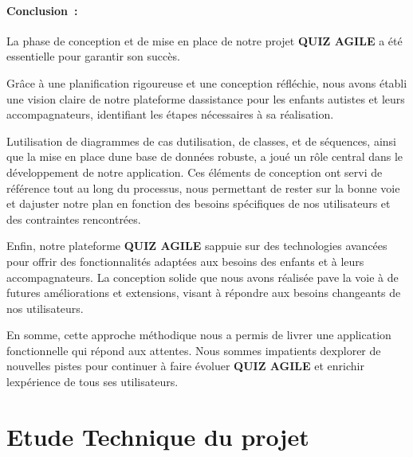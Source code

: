 \documentclass[12pt,a4paper,twoside,openright]{report}
\let\origchapter\chapter
\renewcommand{\chapter}[1]{%
  \cleardoublepage%
  \origchapter{#1}%
}
\begin{document}
\hypertarget{conclusion-2}{%
\subsubsection{\texorpdfstring{\textbf{Conclusion}~:}{Conclusion~:}}\label{conclusion-2}}

La phase de conception et de mise en place de notre projet \textbf{QUIZ
AGILE} a été essentielle pour garantir son succès.

Grâce à une planification rigoureuse et une conception réfléchie, nous
avons établi une vision claire de notre plateforme
d\textquotesingle assistance pour les enfants autistes et leurs
accompagnateurs, identifiant les étapes nécessaires à sa réalisation.

L\textquotesingle utilisation de diagrammes de cas
d\textquotesingle utilisation, de classes, et de séquences, ainsi que la
mise en place d\textquotesingle une base de données robuste, a joué un
rôle central dans le développement de notre application. Ces éléments de
conception ont servi de référence tout au long du processus, nous
permettant de rester sur la bonne voie et d\textquotesingle ajuster
notre plan en fonction des besoins spécifiques de nos utilisateurs et
des contraintes rencontrées.

Enfin, notre plateforme \textbf{QUIZ AGILE} s\textquotesingle appuie sur
des technologies avancées pour offrir des fonctionnalités adaptées aux
besoins des enfants et à leurs accompagnateurs. La conception solide que
nous avons réalisée pave la voie à de futures améliorations et
extensions, visant à répondre aux besoins changeants de nos
utilisateurs.

En somme, cette approche méthodique nous a permis de livrer une
application fonctionnelle qui répond aux attentes. Nous sommes
impatients d\textquotesingle explorer de nouvelles pistes pour continuer
à faire évoluer \textbf{QUIZ AGILE} et enrichir
l\textquotesingle expérience de tous ses utilisateurs.

\hypertarget{section-5}{%
\section{}\label{section-5}}

\hypertarget{chapitre-4-etude-technique-du-projet}{%
\chapter{Etude Technique du projet}\label{chapitre-4-etude-technique-du-projet}}
\end{document}
